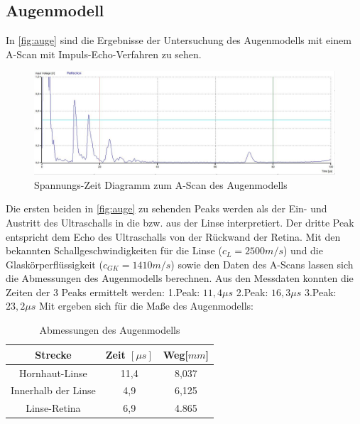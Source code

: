 \subsection{Augenmodell}
In \autoref{fig:auge} sind die Ergebnisse der Untersuchung des Augenmodells mit einem A-Scan mit Impuls-Echo-Verfahren zu sehen.
\begin{figure}[H]
  \centering
  \includegraphics[width=\textwidth]{messungen/auge/auge.jpg}
  \caption{Spannungs-Zeit Diagramm zum A-Scan des Augenmodells}
  \label{fig:auge}
\end{figure}

Die ersten beiden in \autoref{fig:auge} zu sehenden Peaks werden als der Ein- und Austritt des Ultraschalls in die bzw. aus der Linse interpretiert. Der dritte Peak entspricht dem Echo des Ultraschalls von der Rückwand der Retina. Mit den bekannten Schallgeschwindigkeiten für die Linse ($c_{L} = 2500 m/s$) und die Glaskörperflüssigkeit ($c_{GK} = 1410 m/s$) sowie den Daten des A-Scans lassen sich die Abmessungen des Augenmodells berechnen. Aus den Messdaten konnten die Zeiten der 3 Peaks ermittelt werden:\newline
1.Peak: $11,4 \mu s$ \newline 2.Peak: $16,3 \mu s$ \newline 3.Peak: $23,2 \mu s$ \newline
Mit ergeben sich für die Maße des Augenmodells:
\begin{table}
  \centering
  \caption{Abmessungen des Augenmodells}
\label{tab:mess2}
  \begin{tabular}{c c c}
  \toprule
  Strecke & Zeit $[\mu s]$ & Weg[$mm$]\\
  \midrule
  Hornhaut-Linse & 11,4 & 8,037 \\
  Innerhalb der Linse & 4,9 & 6,125\\
  Linse-Retina & 6,9 & 4.865\\
  \bottomrule
  \end{tabular}
  \end{table}